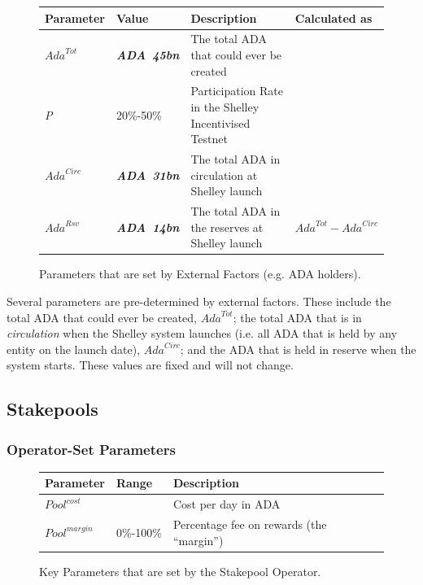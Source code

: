 \documentclass[11pt,a4paper,dvipsnames,twosided,final]{article}
\newcommand{\ada}{ADA{}}
\newcommand{\ADA}[1]{\textbf{\emph{\ada~{#1}}}}
\begin{document}
\begin{figure}[h!]
\begin{center}
\begin{tabular}{||l|l|p{6cm}|l||}
  \hline \hline
\textbf{Parameter} & \textbf{Value} & \textbf{Description} & \textbf{Calculated as} \\\hline
$\textit{Ada}^{Tot}$ & \ADA{45bn} & The total \ada{} that could ever be created & \\\hline
\emph{P} & 20\%-50\% & Participation Rate in the Shelley Incentivised Testnet & \\\hline
$\textit{Ada}^{Circ}$ & \ADA{31bn} & The total \ada{} in circulation at Shelley launch & \\\hline
$\textit{Ada}^{Rsv}$ & \ADA{14bn} & The total \ada{} in the reserves at Shelley launch & $\textit{Ada}^{Tot} - \textit{Ada}^{Circ}$ \\\hline
\hline
\end{tabular}
\end{center}
\caption{Parameters that are set by External Factors (e.g. \ada{} holders).}
\end{figure}

\noindent
Several parameters are pre-determined by external factors. These include the
total \ada{} that could ever be created, $\textit{Ada}^{Tot}$;
the total \ada{} that is in \emph{circulation} when the Shelley system launches
(i.e. all \ada{} that is held by any entity on the launch date), $\textit{Ada}^{Circ}$;
and the \ada{} that is held in reserve when the system starts.
These values are fixed and will not change.

\clearpage
\subsection{Stakepools}

\subsubsection*{Operator-Set Parameters}

\begin{figure}[h!]
\begin{center}
\begin{tabular}{||l|l|p{9cm}||}
  \hline \hline
\textbf{Parameter} & \textbf{Range} & \textbf{Description} \\\hline
{\color{red} $\textit{Pool}^{\textit{cost}}$} &  & {\color{red} Cost per day in \ada{}} \\\hline
{\color{red} ${\textit{Pool}}^{\textit{margin}}$} &  {\color{red} 0\%-100\%} & {\color{red} Percentage fee on rewards (the ``margin'')} \\\hline
  \hline
\end{tabular}
\end{center}
\caption{Key Parameters that are set by the Stakepool Operator.}
\end{figure}
\end{document}
